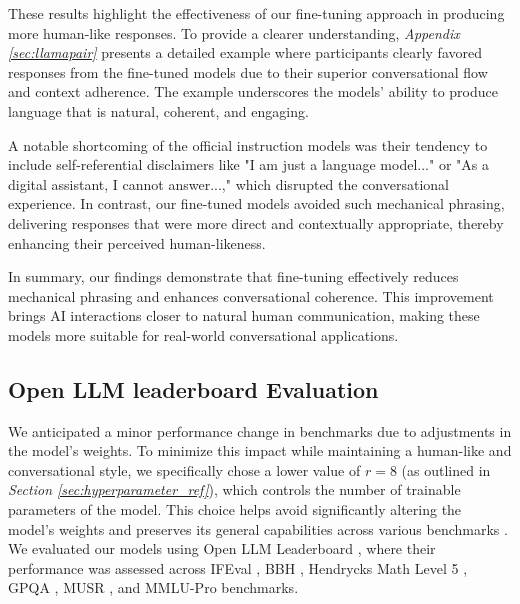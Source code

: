 \documentclass{article}
\begin{document}
These results highlight the effectiveness of our fine-tuning approach in producing more human-like responses. To provide a clearer understanding, \textit{Appendix \ref{sec:llamapair}} presents a detailed example where participants clearly favored responses from the fine-tuned models due to their superior conversational flow and context adherence. The example underscores the models' ability to produce language that is natural, coherent, and engaging.

A notable shortcoming of the official instruction models was their tendency to include self-referential disclaimers like "I am just a language model..." or "As a digital assistant, I cannot answer...," which disrupted the conversational experience. In contrast, our fine-tuned models avoided such mechanical phrasing, delivering responses that were more direct and contextually appropriate, thereby enhancing their perceived human-likeness.

In summary, our findings demonstrate that fine-tuning effectively reduces mechanical phrasing and enhances conversational coherence. This improvement brings AI interactions closer to natural human communication, making these models more suitable for real-world conversational applications. 

\subsection{Open LLM leaderboard Evaluation}

We anticipated a minor performance change in benchmarks due to adjustments in the model's weights. To minimize this impact while maintaining a human-like and conversational style, we specifically chose a lower value of \( r = 8 \) (as outlined in \textit{Section \ref{sec:hyperparameter_ref}}), which controls the number of trainable parameters of the model. This choice helps avoid significantly altering the model's weights and preserves its general capabilities across various benchmarks \cite{ren2024analyzingreducingcatastrophicforgetting}. We evaluated our models using Open LLM Leaderboard \cite{open-llm-leaderboard-v2}, where their performance was assessed across IFEval \cite{zhou2023instructionfollowingevaluationlargelanguage}, BBH \cite{suzgun2022challengingbigbenchtaskschainofthought}, Hendrycks Math Level 5 \cite{hendrycks2021measuringmathematicalproblemsolving}, GPQA \cite{rein2023gpqagraduatelevelgoogleproofqa}, MUSR \cite{sprague2024musrtestinglimitschainofthought}, and MMLU-Pro \cite{wang2024mmluprorobustchallengingmultitask} benchmarks.
\end{document}
